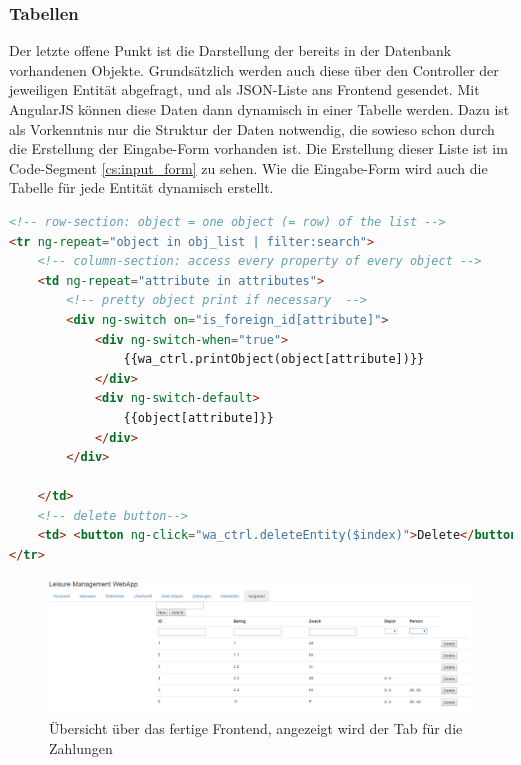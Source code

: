 \subsubsection{Tabellen}

Der letzte offene Punkt ist die Darstellung der bereits in der Datenbank vorhandenen Objekte. Grundsätzlich werden auch diese über den Controller der jeweiligen Entität abgefragt, und als JSON-Liste ans Frontend gesendet. Mit AngularJS können diese Daten dann dynamisch in einer Tabelle werden. Dazu ist als Vorkenntnis nur die Struktur der Daten notwendig, die sowieso schon durch die Erstellung der Eingabe-Form vorhanden ist. Die Erstellung dieser Liste ist im Code-Segment \ref{cs:input_form} zu sehen. Wie die Eingabe-Form wird auch die Tabelle für jede Entität dynamisch erstellt.

\scriptsize
\begin{lstlisting}[caption=index.html, label=cs:input_form, language=HTML]
<!-- row-section: object = one object (= row) of the list -->
<tr ng-repeat="object in obj_list | filter:search">
	<!-- column-section: access every property of every object -->
	<td ng-repeat="attribute in attributes">
		<!-- pretty object print if necessary  -->
		<div ng-switch on="is_foreign_id[attribute]">
			<div ng-switch-when="true">
				{{wa_ctrl.printObject(object[attribute])}}
			</div>
			<div ng-switch-default>
				{{object[attribute]}}
			</div>
		</div>
	
	</td>
	<!-- delete button-->
	<td> <button ng-click="wa_ctrl.deleteEntity($index)">Delete</button> </td>
</tr>
\end{lstlisting}
\normalsize 

\begin{figure}
\centering
\includegraphics[width=1.4\linewidth, angle=90]{4_frontend/pics/frontend_complete}
\caption{Übersicht über das fertige Frontend, angezeigt wird der Tab für die Zahlungen}
\label{fig:frontend_complete}
\end{figure}


